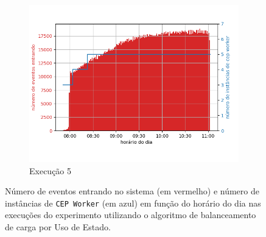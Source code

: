 \begin{figure}[h!]
\begin{subfigure}{.5\textwidth}
  \includegraphics[width=\linewidth]{figuras/graphics/carga_e_workers_horario10-dez-su.png}  
  \caption{Execução 5}
  \label{fig:cewh-10-dez-su}
\end{subfigure}
\caption{Número de eventos entrando no sistema (em vermelho) e número de instâncias de \texttt{CEP Worker} (em azul) em função do horário do dia nas  execuções do experimento utilizando o algoritmo de balanceamento de carga por Uso de Estado.}
\label{fig:load_and_instances-time-SU}

\end{figure}



